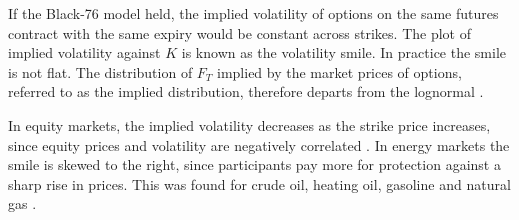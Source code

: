 If the Black-76 model held, the implied volatility of options on the same futures contract with the same expiry would be constant across strikes. The plot of implied volatility against $K$ is known as the volatility smile. In practice the smile is not flat. The distribution of $F_T$ implied by the market prices of options, referred to as the implied distribution, therefore departs from the lognormal \parencite[101--102]{gemanCommoditiesCommodityDerivatives2006}.

In equity markets, the implied volatility decreases as the strike price increases, since equity prices and volatility are negatively correlated \parencite[456]{hullOptionsFuturesOther2022}.
In energy markets the smile is skewed to the right, since participants pay more for protection against a sharp rise in prices. This was found for crude oil, heating oil, gasoline and natural gas
\parencite[105]{gemanCommoditiesCommodityDerivatives2006}.


